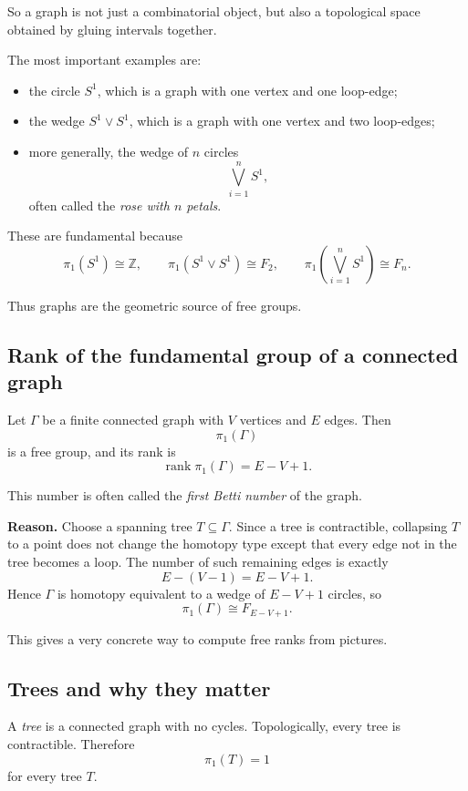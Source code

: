 \documentclass[12pt,a4paper]{article}
\DeclareMathOperator{\rank}{rank}
\theoremstyle{notespace}
\begin{document}
So a graph is not just a combinatorial object, but also a topological space obtained by gluing intervals together.

The most important examples are:

\begin{itemize}
	\item the circle \(S^1\), which is a graph with one vertex and one loop-edge;
	\item the wedge \(S^1\vee S^1\), which is a graph with one vertex and two loop-edges;
	\item more generally, the wedge of \(n\) circles
	\[
	\bigvee_{i=1}^n S^1,
	\]
	often called the \emph{rose with \(n\) petals}.
\end{itemize}

These are fundamental because
\[
\pi_1(S^1)\cong \mathbb Z,
\qquad
\pi_1(S^1\vee S^1)\cong F_2,
\qquad
\pi_1\!\left(\bigvee_{i=1}^n S^1\right)\cong F_n.
\]

Thus graphs are the geometric source of free groups.

\subsection{Rank of the fundamental group of a connected graph}

Let \(\Gamma\) be a finite connected graph with \(V\) vertices and \(E\) edges. Then
\[
\pi_1(\Gamma)
\]
is a free group, and its rank is
\[
\rank \pi_1(\Gamma)=E-V+1.
\]

This number is often called the \emph{first Betti number} of the graph.

\medskip

\textbf{Reason.}
Choose a spanning tree \(T\subseteq \Gamma\). Since a tree is contractible, collapsing \(T\) to a point does not change the homotopy type except that every edge not in the tree becomes a loop. The number of such remaining edges is exactly
\[
E-(V-1)=E-V+1.
\]
Hence \(\Gamma\) is homotopy equivalent to a wedge of \(E-V+1\) circles, so
\[
\pi_1(\Gamma)\cong F_{E-V+1}.
\]

This gives a very concrete way to compute free ranks from pictures.

\subsection{Trees and why they matter}

A \emph{tree} is a connected graph with no cycles. Topologically, every tree is contractible. Therefore
\[
\pi_1(T)=1
\]
for every tree \(T\).
\end{document}
